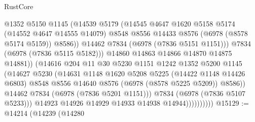\begin{lexlean}{RustCore}
\begin{coremodule}
                                  @1352
                                  @5150
                                  @1145
                                  (@14539
                                    @5179
                                    (@14545
                                      @4647
                                      @1620
                                      @5158
                                      @5174
                                      (@14552 @4647 @14555 @14079)
                                      @8548
                                      @8556
                                      @14433
                                      @8576
                                      (@6978 (@8578 @5174 @5159))
                                      @8586))
                                  @14462
                                  @7834
                                  (@6978 (@7836 @5151 @1151)))
                                @7834
                                (@6978 (@7836 @5115 @5182)))
                              @14860
                              @14863
                              @14866
                              @14870
                              @14875
                              @14881))
                          (@14616
                            @204
                            @11
                            @30
                            @5230
                            @1151
                            @1242
                            @1352
                            @5200
                            @1145
                            (@14627
                              @5230
                              (@14631
                                @1148
                                @1620
                                @5208
                                @5225
                                (@14422 @1148 @14426 @6803)
                                @8548
                                @8556
                                @14640
                                @8576
                                (@6978 (@8578 @5225 @5209))
                                @8586))
                            @14462
                            @7834
                            (@6978 (@7836 @5201 @1151)))
                          @7834
                          (@6978 (@7836 @5107 @5233)))
                        @14923
                        @14926
                        @14929
                        @14933
                        @14938
                        @14944))))))))))
@15129 := @14214
    (@14239
      (@14280

\end{coremodule}
\end{lexlean}
